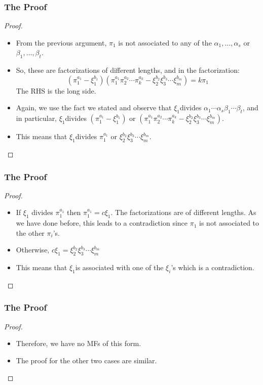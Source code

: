 \begin{frame}
  \frametitle{The Proof}
  \begin{proof}
    \begin{itemize}
      \item<1-> From the previous argument, $\pi_{1}$ is not associated to any of the $\alpha_{1},\ldots,\alpha_{s}$ or $\beta_{1},\ldots,\beta_{t}$. 
      \item<2-> So, these are factorizations of different lengths, and in the factorization:
	  $$(\pi_{1}^{a_{1}}-\xi_{1}^{b_{1}})(\pi_{1}^{a_{1}}\pi_{2}^{a_{2}}\cdots\pi_{k}^{a_{k}}-\xi_{2}^{b_{2}}\xi_{3}^{b_{3}}\cdots\xi_{m}^{b_{m}}) =k\pi_{1}$$
	The RHS is the long side. 
      \item<3-> Again, we use the fact we stated and observe that $\xi_{1}$divides $\alpha_{1}\cdots\alpha_{s}$$\beta_{1}\cdots\beta_{t}$, and in particular, $\xi_{1}$divides $(\pi_{1}^{a_{1}}-\xi_{1}^{b_{1}})$ or $(\pi_{1}^{a_{1}}\pi_{2}^{a_{2}}\cdots\pi_{k}^{a_{k}}-\xi_{2}^{b_{2}}\xi_{3}^{b_{3}}\cdots\xi_{m}^{b_{m}}).$
      \item<4-> This means that $\xi_{1}$divides $\pi_{1}^{a_{1}}$ or $\xi_{2}^{b_{2}}\xi_{3}^{b_{3}}\cdots\xi_{m}^{b_{m}}$.
    \end{itemize}
    \noqedsymbol
  \end{proof}
\end{frame}

\begin{frame}
  \frametitle{The Proof}
  \begin{proof}
    \begin{itemize}
      \item<1-> If $\xi_{1}$ divides $\pi_{1}^{a_{1}}$ then $\pi_{1}^{a_{1}}=c\xi_{1}$.
	The factorizations are of different lengths.
	As we have done before, this leads to a contradiction since $\pi_{1}$ is not associated to the other $\pi_{i}$'s. 
      \item<2-> Otherwise, $c\xi_{1}=\xi_{2}^{b_{2}}\xi_{3}^{b_{3}}\cdots\xi_{m}^{b_{m}}$
      \item<3-> This means that $\xi_{1}$is associated with one of the $\xi_{i}$'s which is a contradiction.
    \end{itemize}
    \noqedsymbol
  \end{proof}
\end{frame}

\begin{frame}
  \frametitle{The Proof}
  \begin{proof}
    \begin{itemize}
      \item<1-> Therefore, we have no MFs of this form.
      \item<2-> The proof for the other two cases are similar. 
    \end{itemize}
  \end{proof}
\end{frame}

